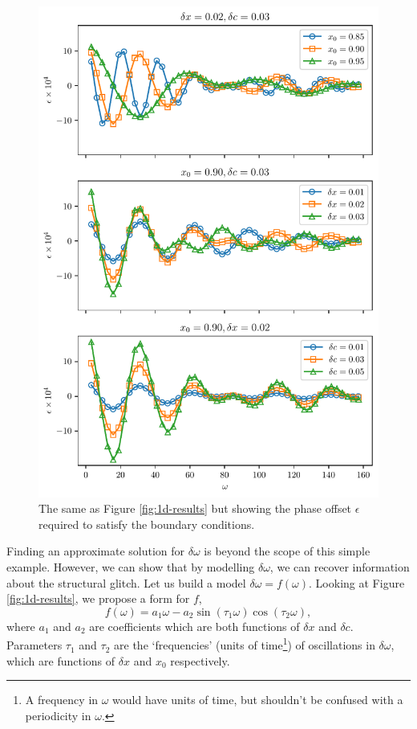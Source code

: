 \begin{figure}
    \centering
    \includegraphics{figures/glitch-1d-example-phase.pdf}
    \caption{The same as Figure \ref{fig:1d-results} but showing the phase offset \(\epsilon\) required to satisfy the boundary conditions.}
    \label{fig:1d-phase}
\end{figure}

Finding an approximate solution for \(\delta\omega\) is beyond the scope of this simple example. However, we can show that by modelling \(\delta\omega\), we can recover information about the structural glitch. Let us build a model \(\delta\omega = f(\omega)\). Looking at Figure \ref{fig:1d-results}, we propose a form for \(f\),
%
\begin{equation}
    f(\omega) = a_1 \omega - a_2 \sin (\tau_1 \omega) \cos (\tau_2 \omega), \label{eq:1d-domega-func}
\end{equation}
%
where \(a_1\) and \(a_2\) are coefficients which are both functions of \(\delta x\) and \(\delta c\). Parameters \(\tau_1\) and \(\tau_2\) are the `frequencies' (units of time\footnote{A frequency in \(\omega\) would have units of time, but shouldn't be confused with a periodicity in \(\omega\).}) of oscillations in \(\delta\omega\), which are functions of \(\delta x\) and \(x_0\) respectively.

